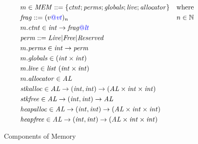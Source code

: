 \documentclass{llncs}
\begin{document}
\begin{figure}[t]
  \begin{align*}
    & m \in \mathit{MEM} ::= \{ \mathit{ctnt}; \mathit{perms}; \mathit{globals}; \mathit{live}; \mathit{allocator} \} & \textnormal{where} \\
    & \mathit{frag} ::= (v{\color{blue} @}\mathit{\color{blue} vt})_n & n \in \mathbb{N} \\
    & m.\mathit{ctnt} \in \mathit{int} \rightarrow \mathit{frag}{\color{blue} @} \mathit{\color{blue} lt} \\
    & \mathit{perm} ::= \mathit{Live} | \mathit{Free} | \mathit{Reserved} \\
    & m.\mathit{perms} \in \mathit{int} \rightarrow \mathit{perm} \\
    & m.\mathit{globals} \in (\mathit{int} \times \mathit{int}) \\
    & m.\mathit{live} \in \mathit{list} ~ (\mathit{int} \times \mathit{int}) \\
    & m.\mathit{allocator} \in \mathit{AL} \\
    & \mathit{stkalloc} \in \mathit{AL} \rightarrow (\mathit{int}, \mathit{int}) \rightarrow (\mathit{AL} \times \mathit{int} \times \mathit{int}) \\
    & \mathit{stkfree} \in \mathit{AL} \rightarrow (\mathit{int}, \mathit{int}) \rightarrow \mathit{AL} \\
    & \mathit{heapalloc} \in \mathit{AL} \rightarrow (\mathit{int}, \mathit{int}) \rightarrow (\mathit{AL} \times \mathit{int} \times \mathit{int}) \\
    & \mathit{heapfree} \in \mathit{AL} \rightarrow (\mathit{int}, \mathit{int}) \rightarrow (\mathit{AL} \times \mathit{int} \times \mathit{int}) \\
  \end{align*}

  \caption{Components of Memory}
  \label{fig:mem}
\end{figure}
\end{document}
